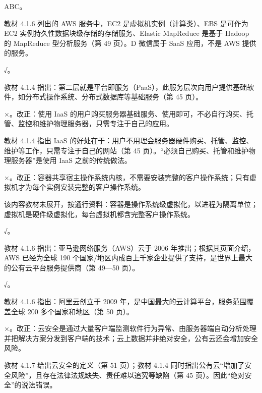 \documentclass[a4paper,11pt]{article}
\begin{document}
\q ABC。\begin{analysis}教材 4.1.6 列出的 AWS 服务中，EC2 是虚拟机实例（计算类）、EBS 是可作为 EC2 实例持久性数据块级存储的存储服务、Elastic MapReduce 是基于 Hadoop 的 MapReduce 型分析服务（第 49 页）。D 微信属于 SaaS 应用，不是 AWS 提供的服务。\end{analysis}


\q √。\begin{analysis}教材 4.1.4 指出：第二层就是平台即服务（PaaS），此服务层次向用户提供基础软件，如分布式操作系统、分布式数据库等基础服务（第 45 页）。\end{analysis}

\q ×。改正：使用 IaaS 的用户购买服务器基础服务、使用即可，不必自行购买、托管、监控和维护物理服务器，只需专注于自己的应用。\begin{analysis}教材 4.1.4 指出 IaaS 的好处在于：用户不用理会服务器硬件购买、托管、监控、维护等工作，只需专注于自己的网站（第 45 页）。“必须自己购买、托管和维护物理服务器”是使用 IaaS 之前的传统做法。\end{analysis}

\q ×。改正：容器共享宿主操作系统内核，不需要安装完整的客户操作系统；只有虚拟机才为每个实例安装完整的客户操作系统。\begin{analysis}该内容教材未展开，按通行资料：容器是操作系统级虚拟化，以进程为隔离单位；虚拟机是硬件级虚拟化，每台虚拟机都含完整客户操作系统。\end{analysis}

\q √。\begin{analysis}教材 4.1.6 指出：亚马逊网络服务（AWS）云于 2006 年推出；根据其页面介绍，AWS 已经为全球 190 个国家/地区内成百上千家企业提供了支持，是世界上最大的公有云平台服务提供商（第 49—50 页）。\end{analysis}

\q √。\begin{analysis}教材 4.1.6 指出：阿里云创立于 2009 年，是中国最大的云计算平台，服务范围覆盖全球 200 多个国家和地区（第 50 页）。\end{analysis}

\q ×。改正：云安全是通过大量客户端监测软件行为异常、由服务器端自动分析处理并把解决方案分发到客户端的技术；云上数据并非绝对安全，公有云还会增加安全风险。\begin{analysis}教材 4.1.7 给出云安全的定义（第 51 页）；教材 4.1.4 同时指出公有云“增加了安全风险”，且存在法律法规缺失、责任难以追究等缺陷（第 45 页）。因此“绝对安全”的说法错误。\end{analysis}
\end{document}
